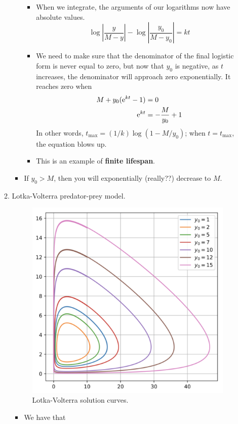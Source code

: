 \documentclass[../notes.tex]{subfiles}
\begin{document}
\begin{itemize}
\begin{enumerate}
\begin{itemize}
            \begin{itemize}
                \item When we integrate, the arguments of our logarithms now have absolute values.
                \begin{equation*}
                    \log\left| \frac{y}{M-y} \right|-\log\left| \frac{y_0}{M-y_0} \right| = kt
                \end{equation*}
                \item We need to make sure that the denominator of the final logistic form is never equal to zero, but now that $y_0$ is negative, as $t$ increases, the denominator will approach zero exponentially. It reaches zero when
                \begin{align*}
                    M+y_0(\e[kt]-1) &= 0\\
                    \e[kt] &= -\frac{M}{y_0}+1
                \end{align*}
                In other words, $t_\text{max}=(1/k)\log(1-M/y_0)$; when $t=t_\text{max}$, the equation blows up.
                \item This is an example of \textbf{finite lifespan}.
            \end{itemize}
            \item If $y_0>M$, then you will exponentially (really??) decrease to $M$.
        \end{itemize}
        \item Lotka-Volterra predator-prey model.
        \begin{figure}[H]
            \centering
            \includegraphics[width=0.4\linewidth]{../ExtFiles/LotkaVolteraSolns.png}
            \caption{Lotka-Volterra solution curves.}
            \label{fig:LotkaVolteraSolns}
        \end{figure}
        \begin{itemize}
            \item We have that
            \begin{align*}

\end{align*}
\end{itemize}
\end{enumerate}
\end{itemize}
\end{document}

